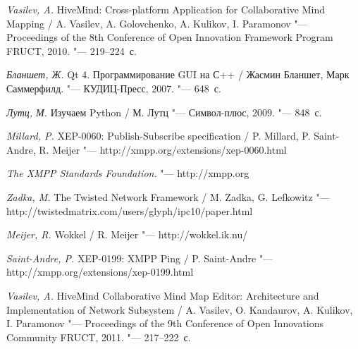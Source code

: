 \newpage
{}
\begin{thebibliography}{99}

\textit {Vasilev, A.}
HiveMind: Cross-platform Application for Collaborative Mind Mapping
/ A. Vasilev, A. Golovchenko, A. Kulikov, I. Paramonov
"--- Proceedings of the 8th Conference of Open Innovation Framework Program
FRUCT, 2010.
"---  219--224~с.

\textit {Бланшет, Ж.} Qt 4. Программирование GUI на С++
/ Жасмин Бланшет, Марк Саммерфилд.
"--- КУДИЦ-Пресс, 2007.
"--- 648~с.

\textit {Лутц, М.} Изучаем Python
/ М. Лутц
"--- Символ-плюс, 2009.
"--- 848~с.

\textit {Millard, P.}  XEP-0060: Publish-Subscribe specification
/ P. Millard, P. Saint-Andre, R. Meijer
"---  http://xmpp.org/extensions/xep-0060.html

\textit {The XMPP Standards Foundation.}
"--- http://xmpp.org

\textit {Zadka, M.} The Twisted Network Framework
/ M. Zadka, G. Lefkowitz
"--- http://twistedmatrix.com/users/glyph/ipc10/paper.html

\textit {Meijer, R.} Wokkel
/ R. Meijer
"--- http://wokkel.ik.nu/

\textit{Saint-Andre, P.} XEP-0199: XMPP Ping
/ P. Saint-Andre
"--- http://xmpp.org/extensions/xep-0199.html

\textit {Vasilev, A.}
HiveMind Collaborative Mind Map Editor: Architecture and Implementation of
Network Subsystem
/ A. Vasilev, O. Kandaurov, A. Kulikov, I. Paramonov 
"--- Proceedings of the 9th Conference of Open Innovations Community FRUCT,
2011.
"---  217--222~с.

\end{thebibliography}